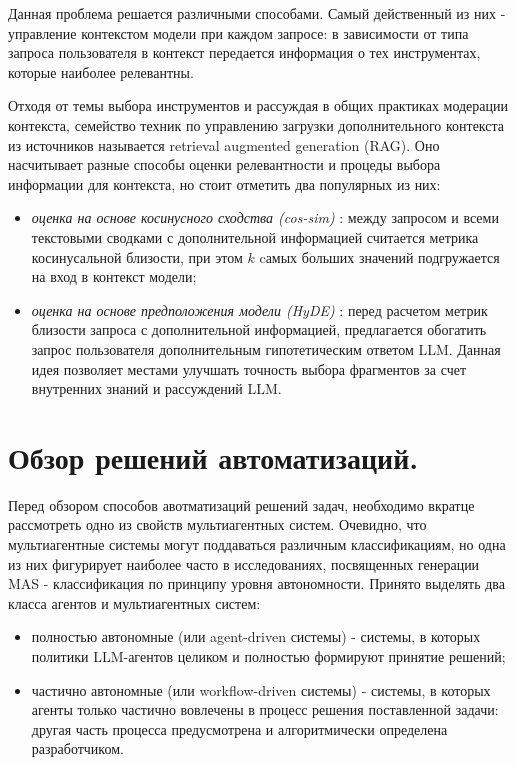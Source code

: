 Данная проблема решается различными способами. Самый действенный из них - управление 
контекстом модели при каждом запросе: в зависимости от типа запроса пользователя в контекст
передается информация о тех инструментах, которые наиболее релевантны. 

Отходя от темы выбора инструментов и рассуждая в общих практиках модерации контекста, 
семейство техник по управлению загрузки дополнительного контекста из источников называется 
retrieval augmented generation (RAG). Оно насчитывает разные способы оценки релевантности
и процеды выбора информации для контекста, но стоит отметить два популярных из них:
\begin{itemize}
    \item \textit{оценка на основе косинусного сходства (cos-sim)} \cite{rag-cossim}: 
между запросом и всеми текстовыми сводками с дополнительной информацией считается 
метрика косинусальной близости, при этом $k$ cамых больших значений подгружается 
на вход в контекст модели;
    \item \textit{оценка на основе предположения модели (HyDE)} \cite{hyde}: перед 
расчетом метрик близости запроса с дополнительной информацией, 
предлагается обогатить запрос пользователя дополнительным гипотетическим ответом LLM. 
Данная идея позволяет местами улучшать точность выбора фрагментов за счет внутренних
знаний и рассуждений LLM.
\end{itemize}

\section{Обзор решений автоматизаций.} \label{ch2:sec2}

Перед обзором способов авотматизаций решений задач, необходимо вкратце рассмотреть одно из
свойств мультиагентных систем. Очевидно, что мультиагентные системы могут 
поддаваться различным классификациям, но одна из них фигурирует наиболее часто в 
исследованиях, посвященных генерации MAS - классификация по принципу уровня автономности. 
Принято выделять два класса агентов и мультиагентных систем:
\begin{itemize}
    \item полностью автономные (или agent-driven системы) - системы, в которых политики
LLM-агентов целиком и полностью формируют принятие решений;
    \item частично автономные (или workflow-driven системы) - системы, в которых агенты
только частично вовлечены в процесс решения поставленной задачи: другая часть процесса 
предусмотрена и алгоритмически определена разработчиком.
\end{itemize} 

